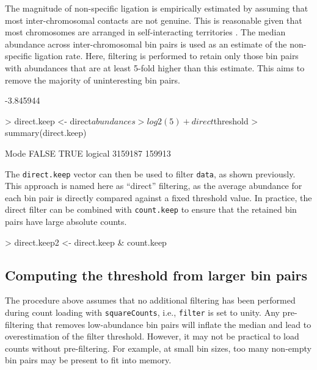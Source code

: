 \documentclass[12pt]{report}
\renewenvironment{Schunk}{\vspace{0pt}}{\vspace{0pt}}
\newcommand{\code}[1]{{\small\texttt{#1}}}
\begin{document}
The magnitude of non-specific ligation is empirically estimated by assuming that most inter-chromosomal contacts are not genuine. 
This is reasonable given that most chromosomes are arranged in self-interacting territories \citep{bickmore2013spatial}.
The median abundance across inter-chromosomal bin pairs is used as an estimate of the non-specific ligation rate. 
Here, filtering is performed to retain only those bin pairs with abundances that are at least 5-fold higher than this estimate.
This aims to remove the majority of uninteresting bin pairs.

\begin{Schunk}
\begin{Soutput}
[1] -3.845944
\end{Soutput}
\begin{Sinput}
> direct.keep <- direct$abundances > log2(5) + direct$threshold
> summary(direct.keep)
\end{Sinput}
\begin{Soutput}
   Mode   FALSE    TRUE 
logical 3159187  159913 
\end{Soutput}
\end{Schunk}

The \code{direct.keep} vector can then be used to filter \code{data}, as shown previously.
This approach is named here as ``direct'' filtering, as the average abundance for each bin pair is directly compared against a fixed threshold value.
In practice, the direct filter can be combined with \code{count.keep} to ensure that the retained bin pairs have large absolute counts.

\begin{Schunk}
\begin{Sinput}
> direct.keep2 <- direct.keep & count.keep
\end{Sinput}
\end{Schunk}

\subsection{Computing the threshold from larger bin pairs}
The procedure above assumes that no additional filtering has been performed during count loading with \code{squareCounts}, i.e., \code{filter} is set to unity.
Any pre-filtering that removes low-abundance bin pairs will inflate the median and lead to overestimation of the filter threshold. 
However, it may not be practical to load counts without pre-filtering.
For example, at small bin sizes, too many non-empty bin pairs may be present to fit into memory.
\end{document}
